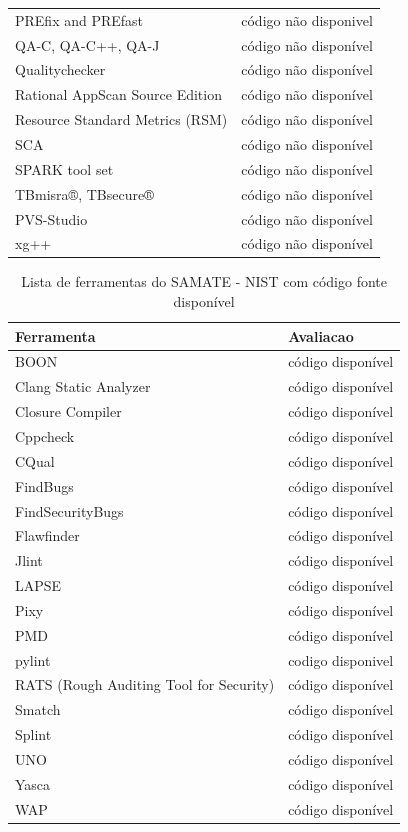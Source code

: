\documentclass[qual, classic, a4paper]{ufbathesis}
\begin{document}
\begin{table}
\begin{tabular}{| l | l |}
PREfix and PREfast        & código não disponivel \\
QA-C, QA-C++, QA-J        & código não disponível \\
Qualitychecker            & código não disponível \\
Rational AppScan Source Edition & código não disponível \\
Resource Standard Metrics (RSM) & código não disponível \\
SCA                       & código não disponível \\
SPARK tool set            & código não disponível \\
TBmisra®, TBsecure®       & código não disponível \\
PVS-Studio                & código não disponível \\
xg++                      & código não disponível \\
\hline
\end{tabular}
\label{ferramentas-do-nist-sem-codigo}
\end{table}

\begin{table}
\caption{Lista de ferramentas do SAMATE - NIST com código fonte disponível}
\centering
\begin{tabular}{| l | l |}
\hline
Ferramenta & Avaliacao  \\
\hline
BOON                      & código disponível \\
Clang Static Analyzer     & código disponível \\
Closure Compiler          & código disponível \\
Cppcheck                  & código disponível \\
CQual                     & código disponível \\
FindBugs                  & código disponível \\
FindSecurityBugs          & código disponível \\
Flawfinder                & código disponível \\
Jlint                     & código disponível \\
LAPSE                     & código disponível \\
Pixy                      & código disponível \\
PMD                       & código disponível \\
pylint                    & codigo disponivel \\
RATS (Rough Auditing Tool for Security) & código disponível \\
Smatch                    & código disponível \\
Splint                    & código disponível \\
UNO                       & código disponível \\
Yasca                     & código disponível \\
WAP                       & código disponível \\
\hline
\end{tabular}
\label{ferramentas-do-nist-com-codigo}
\end{table}
\end{document}
